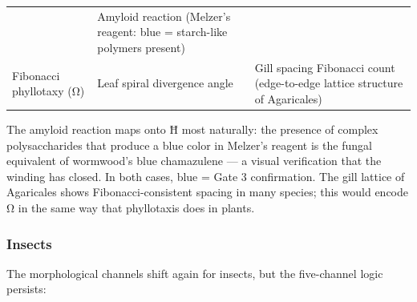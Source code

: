 \documentclass[12pt,a4paper]{article}
\begin{document}
\begin{longtable}[]{@{}lll@{}}
\begin{minipage}[t]{0.30\columnwidth}
\end{minipage} & \begin{minipage}[t]{0.30\columnwidth}\raggedright
Amyloid reaction (Melzer's reagent: blue = starch-like polymers
present)\strut
\end{minipage}\tabularnewline
\begin{minipage}[t]{0.30\columnwidth}\raggedright
Fibonacci phyllotaxy (Ω)\strut
\end{minipage} & \begin{minipage}[t]{0.30\columnwidth}\raggedright
Leaf spiral divergence angle\strut
\end{minipage} & \begin{minipage}[t]{0.30\columnwidth}\raggedright
Gill spacing Fibonacci count (edge-to-edge lattice structure of
Agaricales)\strut
\end{minipage}\tabularnewline
\bottomrule
\end{longtable}

The amyloid reaction maps onto Ħ most naturally: the presence of complex
polysaccharides that produce a blue color in Melzer's reagent is the
fungal equivalent of wormwood's blue chamazulene --- a visual
verification that the winding has closed. In both cases, blue = Gate 3
confirmation. The gill lattice of Agaricales shows Fibonacci-consistent
spacing in many species; this would encode Ω in the same way that
phyllotaxis does in plants.

\hypertarget{insects}{%
\subsubsection{Insects}\label{insects}}

The morphological channels shift again for insects, but the five-channel
logic persists:
\end{document}
